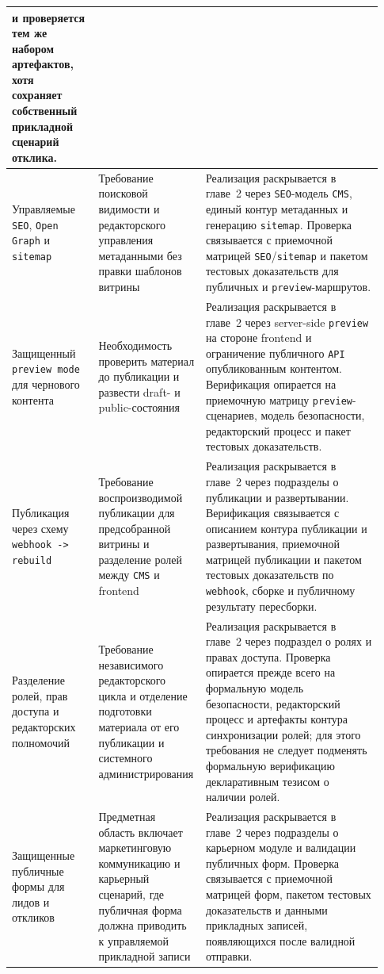 \begin{longtable}{@{}L{0.23\linewidth}L{0.23\linewidth}L{0.47\linewidth}@{}}
  и проверяется тем же набором артефактов, хотя сохраняет собственный прикладной
  сценарий отклика. \\
  \midrule
  Управляемые \texttt{SEO}, \texttt{Open Graph} и \texttt{sitemap} &
  Требование поисковой видимости и редакторского управления метаданными без правки
  шаблонов витрины &
  Реализация раскрывается в главе~2 через \texttt{SEO}-модель \texttt{CMS}, единый контур
  метаданных и генерацию \texttt{sitemap}. Проверка связывается с приемочной матрицей
  \texttt{SEO}/\texttt{sitemap} и пакетом тестовых доказательств для публичных и
  \texttt{preview}-маршрутов. \\
  \midrule
  Защищенный \texttt{preview mode} для чернового контента &
  Необходимость проверить материал до публикации и развести draft- и public-состояния &
  Реализация раскрывается в главе~2 через server-side \texttt{preview} на стороне
  frontend и ограничение публичного \texttt{API} опубликованным контентом. Верификация
  опирается на приемочную матрицу \texttt{preview}-сценариев, модель безопасности,
  редакторский процесс и пакет тестовых доказательств. \\
  \midrule
  Публикация через схему \texttt{webhook -> rebuild} &
  Требование воспроизводимой публикации для предсобранной витрины и разделение ролей
  между \texttt{CMS} и frontend &
  Реализация раскрывается в главе~2 через подразделы о публикации и развертывании.
  Верификация связывается с описанием контура публикации и развертывания, приемочной
  матрицей публикации и пакетом тестовых доказательств по \texttt{webhook}, сборке и
  публичному результату пересборки. \\
  \midrule
  Разделение ролей, прав доступа и редакторских полномочий &
  Требование независимого редакторского цикла и отделение подготовки материала от его
  публикации и системного администрирования &
  Реализация раскрывается в главе~2 через подраздел о ролях и правах доступа. Проверка
  опирается прежде всего на формальную модель безопасности, редакторский процесс и
  артефакты контура синхронизации ролей; для этого требования не следует подменять
  формальную верификацию декларативным тезисом о наличии ролей. \\
  \midrule
  Защищенные публичные формы для лидов и откликов &
  Предметная область включает маркетинговую коммуникацию и карьерный сценарий, где
  публичная форма должна приводить к управляемой прикладной записи &
  Реализация раскрывается в главе~2 через подразделы о карьерном модуле и валидации
  публичных форм. Проверка связывается с приемочной матрицей форм, пакетом тестовых
  доказательств и данными прикладных записей, появляющихся после валидной отправки. \\
  \bottomrule
\end{longtable}
\endgroup

